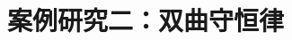\documentclass[../main.tex]{subfiles}
\begin{document}
\chapter{案例研究二：双曲守恒律}\label{chapter:ch07}








\end{document}
